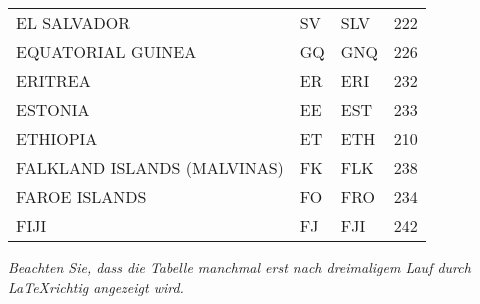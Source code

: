 \begin{footnotesize}
\begin{longtable}[c]{ p{} p{} p{} p{}}
    EL SALVADOR                                    & SV & SLV & 222 \\
    EQUATORIAL GUINEA                              & GQ & GNQ & 226 \\
    ERITREA                                        & ER & ERI & 232 \\
    ESTONIA                                        & EE & EST & 233 \\
    ETHIOPIA                                       & ET & ETH & 210 \\
    FALKLAND ISLANDS (MALVINAS)                    & FK & FLK & 238 \\
    FAROE ISLANDS                                  & FO & FRO & 234 \\
    FIJI                                           & FJ & FJI & 242 \\
    \bottomrule
  \end{longtable}
\end{footnotesize}
\rmfamily


\textit{Beachten Sie, dass die Tabelle manchmal erst nach dreimaligem Lauf durch \LaTeX richtig angezeigt wird.}